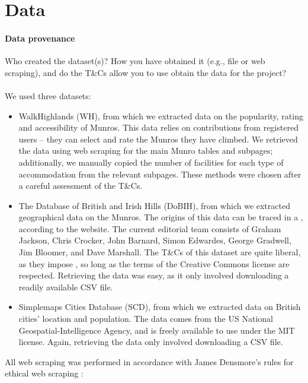 \documentclass[11pt,a4paper]{article}
\begin{document}
\section{Data}

\paragraph{Data provenance} Who created the dataset(s)?  How you have
obtained it (e.g., file or web scraping), and do the T\&Cs allow you
to use obtain the data for the project? \\ \\
We used three datasets: 
\begin{itemize}
    \item WalkHighlands (WH), from which we extracted data on the popularity, rating and accessibility of Munros. This data relies on contributions from registered users – they can select and rate the Munros they have climbed. We retrieved the data using web scraping for the main Munro tables and subpages; additionally, we manually copied the number of facilities for each type of accommodation from the relevant subpages. These methods were chosen after a careful assessment of the T\&Cs.
    \item The Database of British and Irish Hills (DoBIH), from which we extracted geographical data on the Munros. The origins of this data can be traced in a , according to the website. The current editorial team consists of Graham Jackson, Chris Crocker, John Barnard, Simon Edwardes, George Gradwell, Jim Bloomer, and Dave Marshall. The T\&Cs of this dataset are quite liberal, as they impose , so long as the terms of the Creative Commons license are respected. Retrieving the data was easy, as it only involved downloading a readily available CSV file.
    \item Simplemaps Cities Database (SCD), from which we extracted data on British cities' location and population. The data comes from the US National Geospatial-Intelligence Agency, and is freely available to use under the MIT license. Again, retrieving the data only involved downloading a CSV file.
\end{itemize}
All web scraping was performed in accordance with James Densmore's rules for ethical web scraping \cite{EiWS}:
\end{document}
